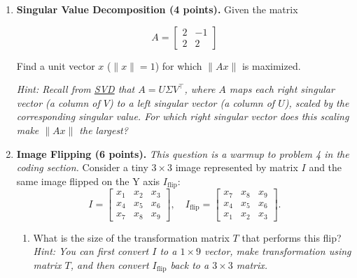 \documentclass[11pt]{article}
\begin{document}
\begin{enumerate}[label=\arabic*., resume]
\begin{enumerate}[label=(\alph*)]
\end{enumerate}
\newpage


    \item \textbf{Singular Value Decomposition (4 points).} Given the matrix
    
    $$A = 
    \begin{bmatrix}
      2 & -1 \\
      2 & 2
    \end{bmatrix}$$
        
    Find a unit vector $x$ ($\|x\|=1$) for which $\|Ax\|$ is maximized.
    
    \textit{Hint: Recall from \href{https://en.wikipedia.org/wiki/Singular_value_decomposition}{SVD} that $A = U \Sigma V^\top$, where $A$ maps each right singular vector (a column of $V$) to a left singular vector (a column of $U$), scaled by the corresponding singular value. For which right singular vector does this scaling make $\|Ax\|$ the largest?}

    

\newpage
    \item\textbf{Image Flipping (6 points).}
        \textit{This question is a warmup to problem 4 in the coding section.} 
        Consider a tiny $3\times 3$ image represented by matrix $I$ and the same image flipped on the Y axis $I_{\text{flip}}$:
        \[
        I =
        \begin{bmatrix}
        x_1 & x_2 & x_3 \\
        x_4 & x_5 & x_6 \\
        x_7 & x_8 & x_9
        \end{bmatrix},
        \quad
        I_{\text{flip}} =
        \begin{bmatrix}
        x_7 & x_8 & x_9 \\
        x_4 & x_5 & x_6 \\
        x_1 & x_2 & x_3
        \end{bmatrix}.
        \]
        
        \begin{enumerate}[label=(\alph*)]
            \item What is the size of the transformation matrix $T$ that performs this flip? 
            \textit{Hint: You can first convert $I$ to a $1\times 9$ vector, make transformation using matrix $T$, and then convert $I_{\text{flip}}$ back to a $3\times 3$ matrix.}

            

\end{enumerate}
\end{enumerate}
\end{document}
